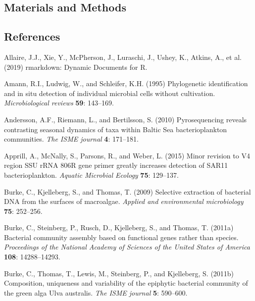 \documentclass[12pt,]{article}
\begin{document}
\hypertarget{materials-and-methods-1}{%
\subsection{Materials and Methods}\label{materials-and-methods-1}}

\newpage

\newpage

\hypertarget{references}{%
\subsection*{References}\label{references}}

\hypertarget{refs}{}
\leavevmode\hypertarget{ref-Allaire2019}{}%
Allaire, J.J., Xie, Y., McPherson, J., Luraschi, J., Ushey, K., Atkins,
A., et al. (2019) rmarkdown: Dynamic Documents for R.

\leavevmode\hypertarget{ref-Amann1995}{}%
Amann, R.I., Ludwig, W., and Schleifer, K.H. (1995) Phylogenetic
identification and in situ detection of individual microbial cells
without cultivation. \emph{Microbiological reviews} \textbf{59}:
143--169.

\leavevmode\hypertarget{ref-Andersson2010}{}%
Andersson, A.F., Riemann, L., and Bertilsson, S. (2010) Pyrosequencing
reveals contrasting seasonal dynamics of taxa within Baltic Sea
bacterioplankton communities. \emph{The ISME journal} \textbf{4}:
171--181.

\leavevmode\hypertarget{ref-Apprill2015}{}%
Apprill, A., McNally, S., Parsons, R., and Weber, L. (2015) Minor
revision to V4 region SSU rRNA 806R gene primer greatly increases
detection of SAR11 bacterioplankton. \emph{Aquatic Microbial Ecology}
\textbf{75}: 129--137.

\leavevmode\hypertarget{ref-Burke2009}{}%
Burke, C., Kjelleberg, S., and Thomas, T. (2009) Selective extraction of
bacterial DNA from the surfaces of macroalgae. \emph{Applied and
environmental microbiology} \textbf{75}: 252--256.

\leavevmode\hypertarget{ref-Burke2011a}{}%
Burke, C., Steinberg, P., Rusch, D., Kjelleberg, S., and Thomas, T.
(2011a) Bacterial community assembly based on functional genes rather
than species. \emph{Proceedings of the National Academy of Sciences of
the United States of America} \textbf{108}: 14288--14293.

\leavevmode\hypertarget{ref-Burke2011b}{}%
Burke, C., Thomas, T., Lewis, M., Steinberg, P., and Kjelleberg, S.
(2011b) Composition, uniqueness and variability of the epiphytic
bacterial community of the green alga Ulva australis. \emph{The ISME
journal} \textbf{5}: 590--600.
\end{document}
